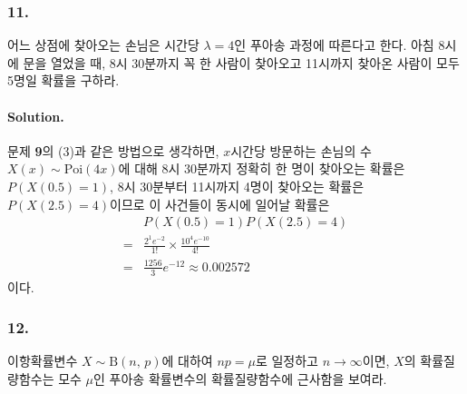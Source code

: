 \subsubsection{11.} 어느 상점에 찾아오는 손님은 시간당 $\lambda = 4$인 푸아송 과정에 따른다고 한다. 아침 8시에 문을 열었을 때,
8시 30분까지 꼭 한 사람이 찾아오고 11시까지 찾아온 사람이 모두 5명일 확률을 구하라.

\paragraph{Solution.} 문제 \textbf{9}의 (3)과 같은 방법으로 생각하면,
$x$시간당 방문하는 손님의 수 $X\left(x\right) \sim \mathrm{Poi}\left(4x\right)$에 대해
8시 30분까지 정확히 한 명이 찾아오는 확률은 $P\left(X\left(0.5\right) = 1\right)$,
8시 30분부터 11시까지 4명이 찾아오는 확률은 $P\left(X\left(2.5\right) = 4\right)$이므로 이 사건들이 동시에 일어날 확률은
\begin{align*}
	& P\left(X\left(0.5\right) = 1\right)P\left(X\left(2.5\right) = 4\right) \\
	=& \frac{2^1 e^{-2}}{1!} \times \frac{10^4 e^{-10}}{4!} \\
	=& \frac{1256}{3} e^{-12} \approx 0.002572
\end{align*}
이다.

\subsubsection{12.} 이항확률변수 $X\sim\mathrm{B}\left(n,\,p\right)$에 대하여 $np=\mu$로 일정하고 $n\rightarrow\infty$이면, $X$의 확률질량함수는
모수 $\mu$인 푸아송 확률변수의 확률질량함수에 근사함을 보여라.

